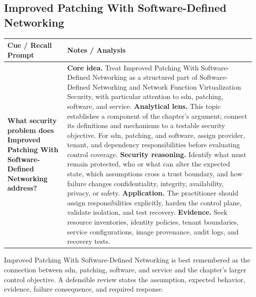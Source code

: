 \documentclass[11pt]{article}
\newcommand{\CornellHeader}{%
\rowcolor{Navy}\color{white}\bfseries Cue / Recall Prompt & \color{white}\bfseries Notes / Analysis\\\hline}
\newcommand{\CornellRow}[2]{%
\cellcolor{CueGray}\RaggedRight\textbf{#1} & \RaggedRight #2\\\hline}
\begin{document}
\subsection*{Improved Patching With Software-Defined Networking}
\begin{longtable}{>{\RaggedRight\arraybackslash}p{}|>{\RaggedRight\arraybackslash}p{}}
\CornellHeader
\CornellRow{What security problem does Improved Patching With Software-Defined Networking address?}{\textbf{Core idea.} Treat Improved Patching With Software-Defined Networking as a structured part of Software-Defined Networking and Network Function Virtualization Security, with particular attention to sdn, patching, software, and service. \textbf{Analytical lens.} This topic establishes a component of the chapter's argument; connect its definitions and mechanisms to a testable security objective. For sdn, patching, and software, assign provider, tenant, and dependency responsibilities before evaluating control coverage. \textbf{Security reasoning.} Identify what must remain protected, who or what can alter the expected state, which assumptions cross a trust boundary, and how failure changes confidentiality, integrity, availability, privacy, or safety. \textbf{Application.} The practitioner should assign responsibilities explicitly, harden the control plane, validate isolation, and test recovery. \textbf{Evidence.} Seek resource inventories, identity policies, tenant boundaries, service configurations, image provenance, audit logs, and recovery tests.}
\end{longtable}
\begin{topicsummary}
Improved Patching With Software-Defined Networking is best remembered as the connection between sdn, patching, software, and service and the chapter's larger control objective. A defensible review states the assumption, expected behavior, evidence, failure consequence, and required response.
\end{topicsummary}
\end{document}
